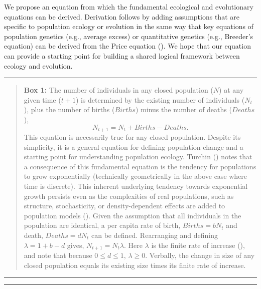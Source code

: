 \documentclass[
]{article}
\begin{document}
We propose an equation from which the fundamental ecological and
evolutionary equations can be derived. Derivation follows by adding
assumptions that are specific to population ecology or evolution in the
same way that key equations of population genetics (e.g., average
excess) or quantitative genetics (e.g., Breeder's equation) can be
derived from the Price equation (). We hope that our equation can provide a starting point for
building a shared logical framework between ecology and evolution.

\begin{center}\rule{0.5\linewidth}{0.5pt}\end{center}

\begin{quote}
\textbf{Box 1:} The number of individuals in any closed population
(\(N\)) at any given time (\(t + 1\)) is determined by the existing
number of individuals (\(N_{t}\)), plus the number of births
(\(Births\)) minus the number of deaths (\(Deaths\)),
\[N_{t+1} = N_{t} + Births - Deaths.\] This equation is necessarily true
for any closed population. Despite its simplicity, it is a general
equation for defining population change and a starting point for
understanding population ecology. Turchin
() notes that a consequence of this
fundamental equation is the tendency for populations to grow
exponentially (technically geometrically in the above case where time is
discrete). This inherent underlying tendency towards exponential growth
persists even as the complexities of real populations, such as
structure, stochasticity, or density-dependent effects are added to
population models (). Given the
assumption that all individuals in the population are identical, a per
capita rate of birth, \(Births = bN_{t}\) and death, \(Deaths = dN_{t}\)
can be defined. Rearranging and defining \(\lambda = 1 + b - d\) gives,
\(N_{t+1} = N_{t}\lambda\). Here \(\lambda\) is the finite rate of
increase (), and note that
because \(0 \leq d \leq 1\), \(\lambda \geq 0\). Verbally, the change in
size of any closed population equals its existing size times its finite
rate of increase.
\end{quote}

\begin{center}\rule{0.5\linewidth}{0.5pt}\end{center}

\begin{center}\rule{0.5\linewidth}{0.5pt}\end{center}
\end{document}
